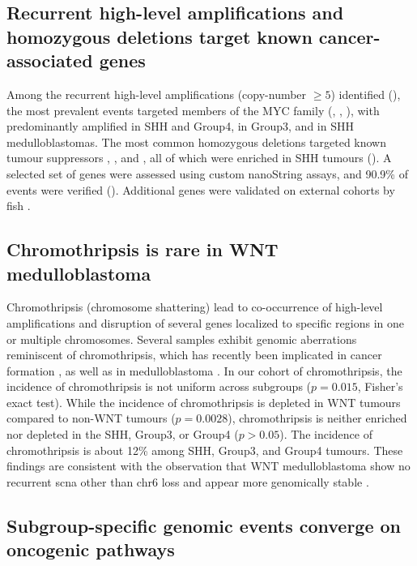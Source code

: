 \subsection{Recurrent high-level amplifications and homozygous deletions target known cancer-associated genes}

Among the recurrent high-level amplifications (copy-number $\geq 5$) identified (), the most prevalent events targeted members of the MYC family (, , ), with  predominantly amplified in SHH and Group4,  in Group3, and  in SHH medulloblastomas. The most common homozygous deletions targeted known tumour suppressors , , and , all of which were enriched in SHH tumours (). A selected set of genes were assessed using custom nanoString assays, and 90.9\% of events were verified (). Additional genes were validated on external cohorts by \gls{fish} .

\subsection{Chromothripsis is rare in WNT medulloblastoma}

Chromothripsis (chromosome shattering) lead to co-occurrence of high-level amplifications and disruption of several genes localized to specific regions in one or multiple chromosomes. Several samples exhibit genomic aberrations reminiscent of chromothripsis, which has recently been implicated in cancer formation , as well as in medulloblastoma . In our cohort of chromothripsis, the incidence of chromothripsis is not uniform across subgroups ($p = 0.015$, Fisher's exact test). While the incidence of chromothripsis is depleted in WNT tumours compared to non-WNT tumours ($p = 0.0028$), chromothripsis is neither enriched nor depleted in the SHH, Group3, or Group4 ($p > 0.05$). The incidence of chromothripsis is about 12\% among SHH, Group3, and Group4 tumours. These findings are consistent with the observation that WNT medulloblastoma show no recurrent \gls{scna} other than chr6 loss and appear more genomically stable .

\subsection{Subgroup-specific genomic events converge on oncogenic pathways}

